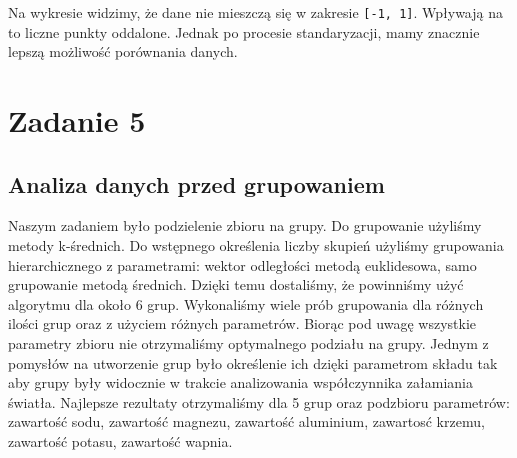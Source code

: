 \documentclass[a4paper,12pt,twoside]{article}
\begin{document}
Na wykresie widzimy, że dane nie mieszczą się w zakresie \texttt{[-1, 1]}. Wpływają na to liczne punkty oddalone.
Jednak po procesie standaryzacji, mamy znacznie lepszą możliwość porównania danych.

\section{Zadanie 5}
\subsection{Analiza danych przed grupowaniem}
Naszym zadaniem było podzielenie zbioru na grupy. Do grupowanie użyliśmy metody k-średnich. Do wstępnego określenia liczby skupień użyliśmy grupowania hierarchicznego z parametrami: wektor odległości metodą euklidesowa, samo grupowanie metodą średnich. Dzięki temu dostaliśmy, że powinniśmy użyć algorytmu dla około 6 grup. Wykonaliśmy wiele prób grupowania dla różnych ilości grup oraz z użyciem różnych parametrów. Biorąc pod uwagę wszystkie parametry zbioru nie otrzymaliśmy optymalnego podziału na grupy. Jednym z pomysłów na utworzenie grup było określenie ich dzięki parametrom składu tak aby grupy były widocznie w trakcie analizowania współczynnika załamiania światła. Najlepsze rezultaty otrzymaliśmy dla 5 grup oraz podzbioru parametrów: 
zawartość sodu, zawartość magnezu, zawartość aluminium, zawartosć krzemu, zawartość potasu, zawartość wapnia.
\end{document}
